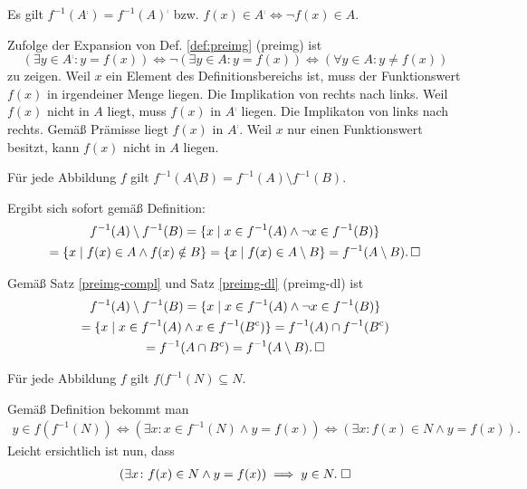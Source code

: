 \begin{Satz}\label{preimg-compl}
Es gilt $f^{-1}(A^\comp)=f^{-1}(A)^\comp$ bzw.
$f(x)\in A^\comp\Leftrightarrow \neg f(x)\in A$.
\end{Satz}
\begin{Beweis} Zufolge der Expansion von Def. \ref{def:preimg} (preimg) ist
\[(\exists y\in A^\comp\colon y=f(x))\iff \neg (\exists y\in A\colon y=f(x))
\iff (\forall y\in A\colon y\ne f(x))\]
zu zeigen. Weil $x$ ein Element des Definitionsbereichs ist, muss
der Funktionswert $f(x)$ in irgendeiner Menge liegen. Die Implikation
von rechts nach links. Weil $f(x)$ nicht in $A$ liegt, muss $f(x)$
in $A^\comp$ liegen. Die Implikaton von links nach rechts.
Gemäß Prämisse liegt $f(x)$ in $A^\comp$. Weil $x$ nur einen
Funktionswert besitzt, kann $f(x)$ nicht in $A$ liegen.\,\qedsymbol
\end{Beweis}

\begin{Satz}\label{preimg-setminus}
Für jede Abbildung $f$ gilt
$f^{-1}(A\setminus B) = f^{-1}(A)\setminus f^{-1}(B)$.
\end{Satz}
\begin{Beweis}[Beweis 1] Ergibt sich sofort gemäß Definition:
\begin{gather*}
f^{-1}(A)\setminus f^{-1}(B) = \{x\mid x\in f^{-1}(A)\land \neg x\in f^{-1}(B)\}\\
= \{x\mid f(x)\in A\land f(x)\notin B\}
= \{x\mid f(x)\in A\setminus B\}
= f^{-1}(A\setminus B).\,\square
\end{gather*}
\end{Beweis}
\begin{Beweis}[Beweis 2] Gemäß Satz \ref{preimg-compl} und Satz
\ref{preimg-dl} (preimg-dl) ist
\begin{gather*}
f^{-1}(A)\setminus f^{-1}(B) = \{x\mid x\in f^{-1}(A)\land \neg x\in f^{-1}(B)\}\\
= \{x\mid x\in f^{-1}(A)\land x\in f^{-1}(B^\mathrm c)\}
= f^{-1}(A)\cap f^{-1}(B^\mathrm c)\\
= f^{-1}(A\cap B^\mathrm c) = f^{-1}(A\setminus B).\,\square
\end{gather*}
\end{Beweis}

\begin{Satz}\label{img-preimg}
Für jede Abbildung $f$ gilt $f(f^{-1}(N)\subseteq N$.
\end{Satz}
\begin{Beweis}
Gemäß Definition bekommt man
\begin{gather*}
y\in f(f^{-1}(N))
\iff (\exists x\colon x\in f^{-1}(N)\land y=f(x))
\iff (\exists x\colon f(x)\in N\land y=f(x)).
\end{gather*}
Leicht ersichtlich ist nun, dass
\begin{gather*}
(\exists x\colon f(x)\in N\land y=f(x)) \implies y\in N.\;\square
\end{gather*}
\end{Beweis}

